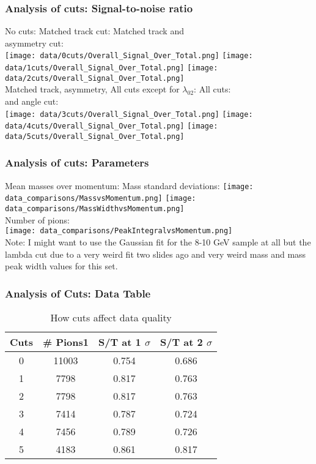 \documentclass{beamer}
\begin{document}
\frame
{
\frametitle{Analysis of cuts: Signal-to-noise ratio}
No cuts:
\noindent\hspace{2.0 cm}Matched track cut:
\noindent\hspace{0.5 cm}Matched track and\\ 
\noindent\hspace{8.0 cm}asymmetry cut:\\
\texttt{[image: data/0cuts/Overall\_Signal\_Over\_Total.png]}
\texttt{[image: data/1cuts/Overall\_Signal\_Over\_Total.png]}
\texttt{[image: data/2cuts/Overall\_Signal\_Over\_Total.png]}\\
Matched track, asymmetry, 
All cuts except for $\lambda_{02}$:
\noindent\hspace{1.0 cm}All cuts:\\
and angle cut:\\
\texttt{[image: data/3cuts/Overall\_Signal\_Over\_Total.png]}
\texttt{[image: data/4cuts/Overall\_Signal\_Over\_Total.png]}
\texttt{[image: data/5cuts/Overall\_Signal\_Over\_Total.png]}
}

\frame
{
\frametitle{Analysis of cuts: Parameters}
Mean masses over momentum: 
\noindent\hspace{1.0 cm} Mass standard deviations:
\texttt{[image: data\_comparisons/MassvsMomentum.png]}
\texttt{[image: data\_comparisons/MassWidthvsMomentum.png]}\\
Number of pions:\\
\texttt{[image: data\_comparisons/PeakIntegralvsMomentum.png]}\\
Note: I might want to use the Gaussian fit for the 8-10 GeV sample at all but the lambda cut due to a very weird fit two slides ago and very weird mass and mass peak width values for this set. 
}

\frame
{
\frametitle{Analysis of Cuts: Data Table}
\begin{table}
\caption{How cuts affect data quality}
\centering
\begin{tabular}{c c c c}
\hline\hline
Cuts & \# Pions1 & S/T at 1 $\sigma$ &  S/T at 2 $\sigma$ \\ [0.5ex] %
\hline
0 & 11003& 0.754 & 0.686 \\
1 & 7798 & 0.817 & 0.763 \\
2 & 7798 & 0.817 & 0.763 \\
3 & 7414 & 0.787 & 0.724 \\
4 & 7456 & 0.789 & 0.726 \\
5 & 4183 & 0.861 & 0.817 \\ [1ex]
\hline
\end{tabular}
\label{table:nonlin}
\end{table}
}
\end{document}
